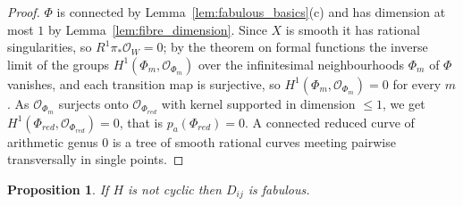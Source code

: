 \documentclass[11pt]{amsart}
\theoremstyle{plain}
\newtheorem{proposition}[theorem]{Proposition}
\theoremstyle{definition}
\theoremstyle{remark}
\numberwithin{equation}{section}
\begin{document}
\begin{proof}
$\Phi$ is connected by Lemma~\ref{lem:fabulous_basics}(c) and has dimension
at most $1$ by Lemma~\ref{lem:fibre_dimension}.  Since $X$ is smooth it has
rational singularities, so $R^1\pi_*\mathcal{O}_W = 0$; by the theorem on
formal functions \cite[Theorem~III.11.1]{Hartshorne} the inverse limit of
the groups $H^1(\Phi_m, \mathcal{O}_{\Phi_m})$ over the infinitesimal
neighbourhoods $\Phi_m$ of $\Phi$ vanishes, and each transition map is
surjective, so $H^1(\Phi_m,\mathcal{O}_{\Phi_m}) = 0$ for every $m$.  As
$\mathcal{O}_{\Phi_m}$ surjects onto $\mathcal{O}_{\Phi_{red}}$ with kernel
supported in dimension $\leq 1$, we get
$H^1(\Phi_{red}, \mathcal{O}_{\Phi_{red}}) = 0$, that is
$p_a(\Phi_{red}) = 0$.  A connected reduced curve of arithmetic genus $0$
is a tree of smooth rational curves meeting pairwise transversally in
single points.
\end{proof}

\begin{proposition} \label{prop:noncyclic_fabulous}
If $H$ is not cyclic then $D_{ij}$ is fabulous.
\end{proposition}
\end{document}
